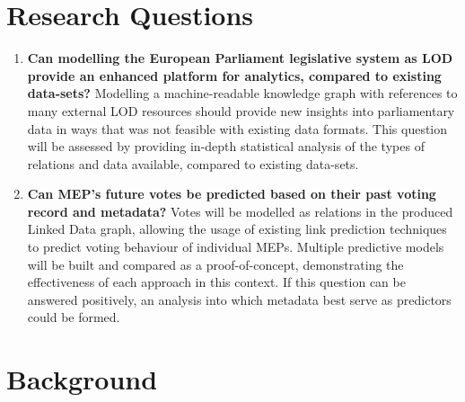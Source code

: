\documentclass{article}
\begin{document}
\section{Research Questions}
\begin{enumerate}
    \item \textbf{Can modelling the European Parliament legislative system as LOD provide an enhanced platform for analytics, compared to existing data-sets?}
    \newline 
    Modelling a machine-readable knowledge graph with references to many external LOD resources should provide new insights into parliamentary data in ways that was not feasible with existing data formats. This question will be assessed by providing in-depth statistical analysis of the types of relations and data available, compared to existing data-sets.
\newline
    \item \textbf{Can MEP's future votes be predicted based on their past voting record and metadata?}
    \newline
    Votes will be modelled as relations in the produced Linked Data graph, allowing the usage of existing link prediction techniques to predict voting behaviour of individual MEPs. Multiple predictive models will be built and compared as a proof-of-concept, demonstrating the effectiveness of each approach in this context.
    \newline
    If this question can be answered positively, an analysis into which metadata best serve as predictors could be formed.
\end{enumerate}

\section{Background}
\end{document}
